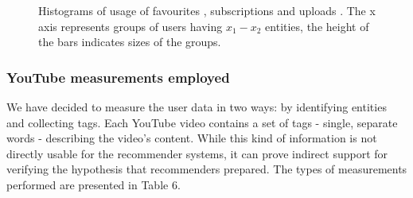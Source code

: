 \begin{figure}[htb]
  \centering
  \label{fig:subfigureExample}
  \caption{Histograms of usage of favourites , subscriptions
   and uploads . The x axis represents groups of
  users having $x_1-x_2$ entities, the height of the bars indicates sizes of the
  groups.}
\end{figure}

\subsubsection{YouTube measurements employed}

We have decided to measure the user data in two ways: by identifying entities
and collecting tags. Each YouTube video contains a set of tags - single,
separate words - describing the video's content. While this kind of information
is not directly usable for the recommender systems, it can prove indirect
support for verifying the hypothesis that recommenders prepared. The types of
measurements performed are presented in Table 6.

